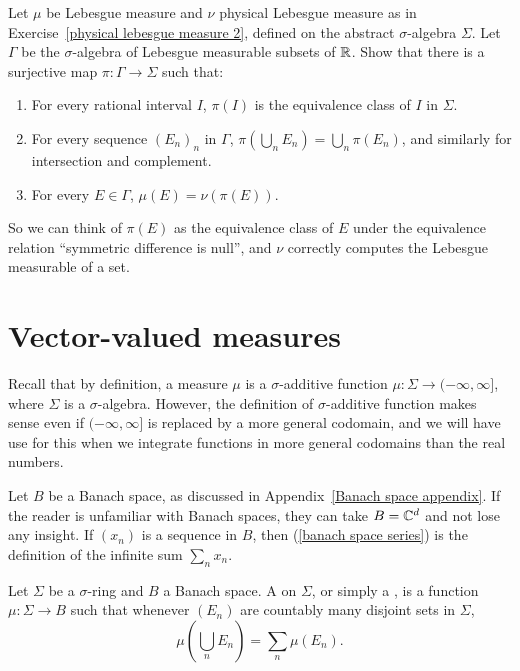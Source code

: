 \begin{exercise}\label{physical lebesgue measure 3}
Let $\mu$ be Lebesgue measure and $\nu$ physical Lebesgue measure as in Exercise~\ref{physical lebesgue measure 2}, defined on the abstract $\sigma$-algebra $\Sigma$.
Let $\Gamma$ be the $\sigma$-algebra of Lebesgue measurable subsets of $\mathbb{R}$. Show that there is a surjective map $\pi: \Gamma \to \Sigma$ such that:
\begin{enumerate}
\item For every rational interval $I$, $\pi(I)$ is the equivalence class of $I$ in $\Sigma$.
\item For every sequence ${(E_{n})}_{n}$ in $\Gamma$, $\pi(\bigcup_{n} E_{n}) = \bigcup_{n} \pi(E_{n})$, and similarly for intersection and complement.
\item For every $E \in \Gamma$, $\mu(E) = \nu(\pi(E))$.
\end{enumerate}
So we can think of $\pi(E)$ as the equivalence class of $E$ under the equivalence relation ``symmetric difference is null'', and $\nu$ correctly computes the Lebesgue measurable of a set.
\end{exercise}

\section{Vector-valued measures}
Recall that by definition, a measure $\mu$ is a $\sigma$-additive function $\mu: \Sigma \to (-\infty, \infty]$, where $\Sigma$ is a $\sigma$-algebra.
However, the definition of $\sigma$-additive function makes sense even if $(-\infty, \infty]$ is replaced by a more general codomain, and we will have use for this when we integrate functions in more general codomains than the real numbers.

\begin{subsec}
Let $B$ be a Banach space, as discussed in Appendix~\ref{Banach space appendix}.
If the reader is unfamiliar with Banach spaces, they can take $B = \mathbb{C}^{d}$ and not lose any insight.
If $(x_{n})$ is a sequence in $B$, then (\ref{banach space series}) is the definition of the infinite sum $\sum_{n} x_{n}$.
\end{subsec}

\begin{definition}
Let $\Sigma$ be a $\sigma$-ring and $B$ a Banach space.
A  on $\Sigma$, or simply a , is a function $\mu: \Sigma \to B$ such that whenever $(E_{n})$ are countably many disjoint sets in $\Sigma$,
\[\mu\left(\bigcup_{n} E_{n}\right) = \sum_{n} \mu(E_{n}).\]
\end{definition}

